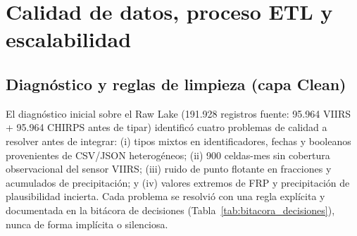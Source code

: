 \documentclass[11pt,a4paper]{article}
\begin{document}
\section{Calidad de datos, proceso ETL y escalabilidad}

\subsection{Diagn\'ostico y reglas de limpieza (capa Clean)}
\label{sec:calidad_clean}
El diagn\'ostico inicial sobre el Raw Lake (191.928 registros fuente: 95.964 VIIRS + 95.964 CHIRPS antes de tipar) identific\'o cuatro problemas de calidad a resolver antes de integrar: (i) tipos mixtos en identificadores, fechas y booleanos provenientes de CSV/JSON heterog\'eneos; (ii) 900 celdas-mes sin cobertura observacional del sensor VIIRS; (iii) ruido de punto flotante en fracciones y acumulados de precipitaci\'on; y (iv) valores extremos de FRP y precipitaci\'on de plausibilidad incierta. Cada problema se resolvi\'o con una regla expl\'icita y documentada en la bit\'acora de decisiones (Tabla~\ref{tab:bitacora_decisiones}), nunca de forma impl\'icita o silenciosa.
\end{document}
